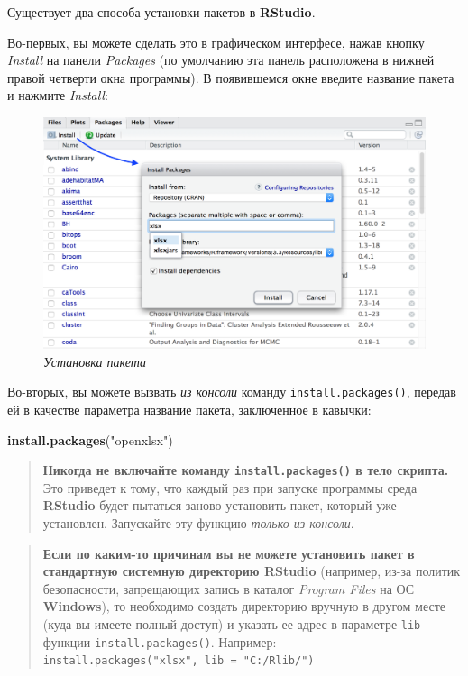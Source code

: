 \documentclass[]{book}
\newenvironment{Shaded}{\begin{snugshade}}{\end{snugshade}}
\newcommand{\KeywordTok}[1]{\textcolor[rgb]{0.13,0.29,0.53}{\textbf{#1}}}
\newcommand{\StringTok}[1]{\textcolor[rgb]{0.31,0.60,0.02}{#1}}
\newcommand{\NormalTok}[1]{#1}
\begin{document}
Существует два способа установки пакетов в \textbf{RStudio}.

Во-первых, вы можете сделать это в графическом интерфесе, нажав кнопку
\emph{Install} на панели \emph{Packages} (по умолчанию эта панель
расположена в нижней правой четверти окна программы). В появившемся окне
введите название пакета и нажмите \emph{Install}:

\begin{figure}
\centering
\includegraphics{images/InstallPackages.png}
\caption{\emph{Установка пакета}}
\end{figure}

Во-вторых, вы можете вызвать \emph{из консоли} команду
\texttt{install.packages()}, передав ей в качестве параметра название
пакета, заключенное в кавычки:

\begin{Shaded}
\begin{Highlighting}[]
\KeywordTok{install.packages}\NormalTok{(}\StringTok{"openxlsx"}\NormalTok{)}
\end{Highlighting}
\end{Shaded}

\begin{quote}
\textbf{Никогда не включайте команду \texttt{install.packages()} в тело
скрипта.} Это приведет к тому, что каждый раз при запуске программы
среда \textbf{RStudio} будет пытаться заново установить пакет, который
уже установлен. Запускайте эту функцию \emph{только из консоли}.
\end{quote}

\begin{quote}
\textbf{Если по каким-то причинам вы не можете установить пакет в
стандартную системную директорию RStudio} (например, из-за политик
безопасности, запрещающих запись в каталог \emph{Program Files} на ОС
\textbf{Windows}), то необходимо создать директорию вручную в другом
месте (куда вы имеете полный доступ) и указать ее адрес в параметре
\texttt{lib} функции \texttt{install.packages()}. Например:
\texttt{install.packages("xlsx",\ lib\ =\ "C:/Rlib/")}
\end{quote}
\end{document}

